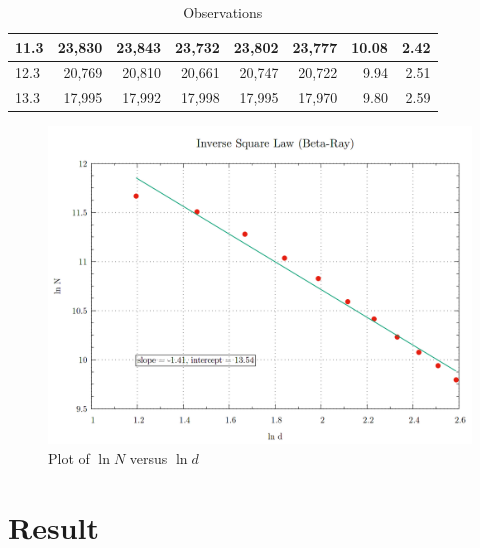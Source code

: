 \begin{table}[h]
\begin{tabular}{|l|r|r|r|r|r|r|r|}
		11.3                                                            & 23,830                                                        & 23,843                                                        & 23,732                                                        & 23,802                                                           & 23,777                                                          & 10.08                                                      & 2.42                                                       \\ \hline
		12.3                                                            & 20,769                                                        & 20,810                                                        & 20,661                                                        & 20,747                                                           & 20,722                                                          & 9.94                                                       & 2.51                                                       \\ \hline
		13.3                                                            & 17,995                                                        & 17,992                                                        & 17,998                                                        & 17,995                                                           & 17,970                                                          & 9.80                                                       & 2.59                                                       \\ \hline
	\end{tabular}
\caption{Observations}
\label{tab:1202-obs}
\end{table}
%


\begin{figure}[!htb]
	\centering
	\includegraphics[width=0.7\linewidth]{Experiments/1202-plot}
	\caption{Plot of $ \ln N $ versus $ \ln d $}
	\label{fig:1202-plot}
\end{figure}



\section{Result}


